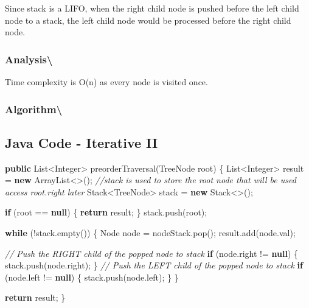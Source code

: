 \documentclass[]{book}
\newenvironment{Shaded}{\begin{snugshade}}{\end{snugshade}}
\newcommand{\BuiltInTok}[1]{#1}
\newcommand{\CommentTok}[1]{\textcolor[rgb]{0.56,0.35,0.01}{\textit{#1}}}
\newcommand{\FunctionTok}[1]{\textcolor[rgb]{0.00,0.00,0.00}{#1}}
\newcommand{\KeywordTok}[1]{\textcolor[rgb]{0.13,0.29,0.53}{\textbf{#1}}}
\newcommand{\NormalTok}[1]{#1}
\begin{document}
Since stack is a LIFO, when the right child node is pushed before the left child node to a stack, the left
child node would be processed before the right child node.

\hypertarget{analysis-74}{%
\subsubsection{Analysis\textbackslash{}}\label{analysis-74}}

Time complexity is O(n) as every node is visited once.

\hypertarget{algorithm-75}{%
\subsubsection{Algorithm\textbackslash{}}\label{algorithm-75}}

\hypertarget{java-code---iterative-ii}{%
\subsection{Java Code - Iterative II}\label{java-code---iterative-ii}}

\begin{Shaded}
\begin{Highlighting}[]
\KeywordTok{public} \BuiltInTok{List}\NormalTok{<}\BuiltInTok{Integer}\NormalTok{> }\FunctionTok{preorderTraversal}\NormalTok{(}\BuiltInTok{TreeNode}\NormalTok{ root) \{}
    \BuiltInTok{List}\NormalTok{<}\BuiltInTok{Integer}\NormalTok{> result = }\KeywordTok{new} \BuiltInTok{ArrayList}\NormalTok{<>();}
    \CommentTok{//stack is used to store the root node that will be used access root.right later}
    \BuiltInTok{Stack}\NormalTok{<}\BuiltInTok{TreeNode}\NormalTok{> stack = }\KeywordTok{new} \BuiltInTok{Stack}\NormalTok{<>();}

    \KeywordTok{if}\NormalTok{ (root == }\KeywordTok{null}\NormalTok{) \{}
        \KeywordTok{return}\NormalTok{ result;}
\NormalTok{    \}}
\NormalTok{    stack.}\FunctionTok{push}\NormalTok{(root);}

    \KeywordTok{while}\NormalTok{ (!stack.}\FunctionTok{empty}\NormalTok{()) \{}
        \BuiltInTok{Node}\NormalTok{ node = nodeStack.}\FunctionTok{pop}\NormalTok{();}
\NormalTok{        result.}\FunctionTok{add}\NormalTok{(node.}\FunctionTok{val}\NormalTok{);}

        \CommentTok{// Push the RIGHT child of the popped node to stack}
        \KeywordTok{if}\NormalTok{ (node.}\FunctionTok{right}\NormalTok{ != }\KeywordTok{null}\NormalTok{) \{}
\NormalTok{            stack.}\FunctionTok{push}\NormalTok{(node.}\FunctionTok{right}\NormalTok{);}
\NormalTok{        \}}
        \CommentTok{// Push the LEFT child of the popped node to stack}
        \KeywordTok{if}\NormalTok{ (node.}\FunctionTok{left}\NormalTok{ != }\KeywordTok{null}\NormalTok{) \{}
\NormalTok{            stack.}\FunctionTok{push}\NormalTok{(node.}\FunctionTok{left}\NormalTok{);}
\NormalTok{        \}}
\NormalTok{    \}}

    \KeywordTok{return}\NormalTok{ result;}
\NormalTok{\}}
\end{Highlighting}
\end{Shaded}
\end{document}

